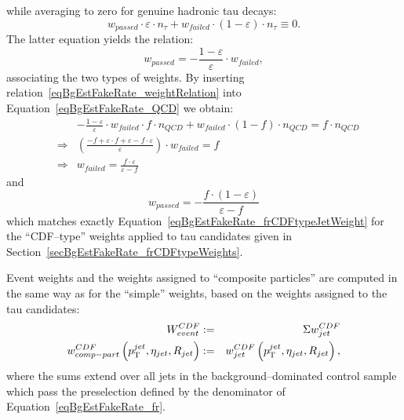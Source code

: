 while averaging to zero for genuine hadronic tau decays:
\begin{equation*}
w_{passed} \cdot \varepsilon \cdot n_{\tau} + w_{failed} \cdot \left( 1 - \varepsilon \right) \cdot n_{\tau} \equiv 0.
\label{eqBgEstFakeRate_tau}
\end{equation*}
The latter equation yields the relation:
\begin{equation}
w_{passed} = -\frac{1 - \varepsilon}{\varepsilon} \cdot w_{failed},
\label{eqBgEstFakeRate_weightRelation}
\end{equation}
associating the two types of weights.  By inserting
relation~\ref{eqBgEstFakeRate_weightRelation} into
Equation~\ref{eqBgEstFakeRate_QCD} we obtain:
\begin{eqnarray*}
& & -\frac{1 - \varepsilon}{\varepsilon} \cdot w_{failed} \cdot f \cdot n_{QCD} + w_{failed} \cdot \left( 1 - f \right) \cdot n_{QCD} 
 = f \cdot n_{QCD} \\
& \Rightarrow & \left( \frac{-f + \varepsilon \cdot f + \varepsilon - f \cdot \varepsilon}{\varepsilon} \right) \cdot w_{failed} = f \\
& \Rightarrow & w_{failed} = \frac{f \cdot \varepsilon}{\varepsilon - f} 
\end{eqnarray*}
and 
\begin{equation}
w_{passed} = -\frac{f \cdot \left( 1 - \varepsilon \right)}{\varepsilon - f}
\end{equation}
which matches exactly Equation~\ref{eqBgEstFakeRate_frCDFtypeJetWeight} for the
``CDF--type'' weights applied to tau candidates given in
Section~\ref{secBgEstFakeRate_frCDFtypeWeights}.

Event weights and the weights assigned to ``composite particles'' 
are computed in the same way as for the ``simple'' weights,
based on the weights assigned to the tau candidates:
\begin{eqnarray}
W_{event}^{CDF} & := & \Sigma w_{jet}^{CDF} \nonumber \\
w_{comp-part}^{CDF} \left( p_{\mathrm{T}}^{jet}, \eta_{jet}, R_{jet} \right) & := & 
  w_{jet}^{CDF} \left( p_{\mathrm{T}}^{jet}, \eta_{jet}, R_{jet} \right),
\label{eqBgEstFakeRate_frCDFtypeEvent_and_CompositeParticleWeight}
\end{eqnarray}
where the sums extend over all jets in the background--dominated control sample
which pass the preselection defined by the denominator of
Equation~\ref{eqBgEstFakeRate_fr}.

